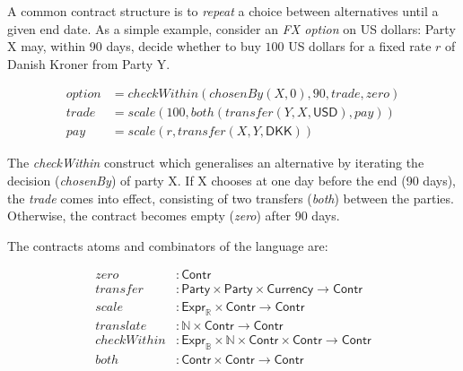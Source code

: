 \documentclass[a4paper,debug,twocolumn]{easychair}
\newcommand{\comm}[3][red]{{\small \color{#1}{$\spadesuit$#2: #3}}}
\newcommand{\jbcomment}[1]{\comm[orange]{jb}{#1}}
\newcommand\type[1]{\mathsf{#1}}
\newcommand\reals{{\mathbb R}}
\newcommand\nats{{\mathbb N}}
\newcommand\bools{{\mathbb B}}
\theoremstyle{plain}
\begin{document}
A common contract structure is to \emph{repeat} a choice
between alternatives until a given end date.
As a simple example, consider an \emph{FX option} on US dollars:
Party X may, within 90 days, decide whether to buy $100$ US dollars for
a fixed rate $r$ of Danish Kroner from Party Y.

\vspace*{-2ex}
{\footnotesize
\begin{align*}
\mathit{option} &= \mathit{checkWithin}(\mathit{chosenBy}(X,0), 90, \mathit{trade}, \mathit{zero})\\
\mathit{trade} &= \mathit{scale}(100, both(\mathit{transfer}(Y, X,\type{USD}), pay))\\
\mathit{pay} &= \mathit{scale}(r, \mathit{transfer}(X, Y,\type{DKK}))
\end{align*}

}
%

The \emph{checkWithin} construct which generalises an alternative by
iterating the decision (\emph{chosenBy}) of party X.
If X chooses at one day before the end (90 days), the \emph{trade} comes
into effect, consisting of two transfers (\emph{both}) between the parties.
Otherwise, the contract becomes empty (\emph{zero}) after 90 days.

The contracts atoms and combinators of the language are:

\vspace*{-3ex}
{\small

\begin{align*}
\mathit{zero} &: \type{Contr}\\[-0.6ex]
\mathit{transfer} &: \type{Party} \times \type{Party} \times \type{Currency}\to \type{Contr}\\[-0.6ex]
\mathit{scale}&: \type{Expr}_\reals \times \type{Contr} \to \type{Contr}\\[-0.6ex]
\mathit{translate}&: \nats \times \type{Contr} \to \type{Contr}\\[-0.6ex]
\mathit{checkWithin}&:  \type{Expr}_\bools \times \nats \times \type{Contr} \times \type{Contr} %
\to \type{Contr}\\[-0.6ex]
\mathit{both}&: \type{Contr} \times \type{Contr} \to \type{Contr}
\end{align*}
\vspace*{-3ex}
}
\end{document}
